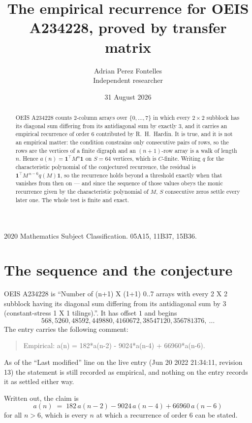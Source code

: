 \documentclass[11pt,a4paper]{article}
\title{The empirical recurrence for OEIS A234228, proved by transfer matrix}
\author{Adrian Perez Fontelles\\ \small Independent researcher}
\date{31 August 2026}
\theoremstyle{plain}
\theoremstyle{definition}
\begin{document}
\maketitle

\begin{abstract}
OEIS A234228 counts $2$-column arrays over $\{0,\dots,7\}$ in which every
$2\times2$ subblock has its diagonal sum differing from its antidiagonal sum by
exactly $3$, and it
carries an empirical recurrence of order $6$ contributed by R.~H.~Hardin. It is true,
and it is not an empirical matter: the condition constrains only consecutive pairs of rows,
so the rows are the vertices of a finite digraph and an $(n+1)$-row array is a walk of
length $n$. Hence $a(n)=\mathbf{1}^{\!\top}M^{n}\mathbf{1}$ on $S=64$ vertices, which
is $C$-finite. Writing $q$ for the characteristic polynomial of the conjectured recurrence,
the residual is $\mathbf{1}^{\!\top}M^{\,n-6}q(M)\mathbf{1}$, so the recurrence
holds beyond a threshold exactly when that vanishes from then on --- and since the sequence
of those values obeys the monic recurrence given by the characteristic polynomial of $M$,
$S$ consecutive zeros settle every later one. The whole test is finite and exact.
\end{abstract}

\noindent\small 2020 Mathematics Subject Classification. 05A15, 11B37, 15B36.\normalsize

\section{The sequence and the conjecture}

OEIS A234228 is ``Number of (n+1) X (1+1) 0..7 arrays with every 2 X 2 subblock having its diagonal sum differing from its antidiagonal sum by 3 (constant-stress 1 X 1 tilings).''. It has offset
$1$ and begins
\[
568, 5260, 48592, 449880, 4160672, 38547120, 356781376,\ \dots
\]
The entry carries the following comment:
\begin{quote}\small
Empirical: a(n) = 182*a(n-2) - 9024*a(n-4) + 66960*a(n-6).
\end{quote}
As of the ``Last modified'' line on the live entry (Jun 20 2022 21:34:11, revision 13) the statement is
still recorded as empirical, and nothing on the entry records it as settled either way.

Written out, the claim is
\begin{equation}\label{eq:conj}
a(n)\;=\;182\,a(n-2) - 9024\,a(n-4) + 66960\,a(n-6)
\end{equation}
for all $n>6$, which is every $n$ at which a recurrence of order $6$ can be
stated.
\end{document}
